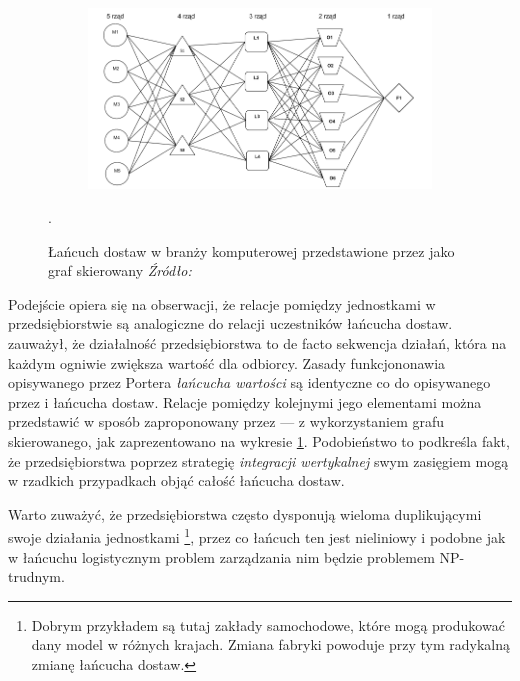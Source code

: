 \documentclass[polish, twoside, 12pt, a4paper]{article}
\theoremstyle{definition}
\theoremstyle{plain}
\theoremstyle{remark}
\begin{document}
\begin{figure}[hbt]
  \centering
  \begin{subfigure}[t]{0.8\textwidth}
    \includegraphics[width=\textwidth]{pictures/siec.png}
  \end{subfigure}
  \captionsetup{margin=10pt,font=small,labelfont=bf,width=.8\textwidth}
  \caption[Łańcuch dostaw w postaci grafu kierunkowego]{Łańcuch dostaw w branży komputerowej przedstawione przez \cite{Kawa2010} jako graf skierowany \textit{Źródło:} \cite{Kawa2010}}\label{fig:siecKawa}.
\end{figure}

Podejście opiera się na obserwacji, że relacje pomiędzy jednostkami w przedsiębiorstwie są analogiczne do relacji uczestników łańcucha dostaw. \cite{Porter1985} zauważył, że działalność przedsiębiorstwa to de facto sekwencja działań, która na każdym ogniwie zwiększa wartość dla odbiorcy. Zasady funkcjononawia opisywanego przez Portera \textit{łańcucha wartości} są identyczne co do opisywanego przez \cite{Moyaux2006} i \cite{Kawa2010} łańcucha dostaw. Relacje pomiędzy kolejnymi jego elementami można przedstawić w sposób zaproponowany przez \cite{Kawa2010} --- z wykorzystaniem grafu skierowanego, jak zaprezentowano na wykresie \ref{fig:siecKawa}. Podobieństwo to podkreśla fakt, że przedsiębiorstwa poprzez strategię \textit{integracji wertykalnej} swym zasięgiem mogą w rzadkich przypadkach objąć całość łańcucha dostaw.  

Warto zuważyć, że przedsiębiorstwa często dysponują wieloma duplikującymi swoje działania jednostkami \footnote{Dobrym przykładem są tutaj zakłady samochodowe, które mogą produkować dany model w różnych krajach. Zmiana fabryki powoduje przy tym radykalną zmianę łańcucha dostaw.}, przez co łańcuch ten jest nieliniowy i podobne jak w łańcuchu logistycznym problem zarządzania nim będzie problemem NP-trudnym.
\end{document}
